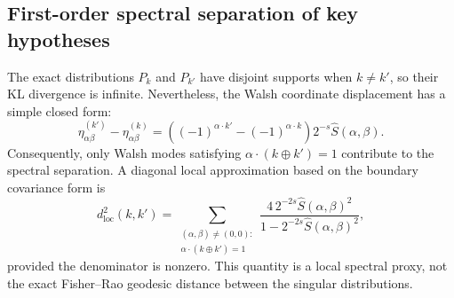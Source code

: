 \subsection{First-order spectral separation of key hypotheses}

The exact distributions $P_k$ and $P_{k'}$ have disjoint supports when
$k\neq k'$, so their KL divergence is infinite.  Nevertheless, the Walsh
coordinate displacement has a simple closed form:
\begin{equation}\label{eq:eta-displacement}
  \eta^{(k')}_{\alpha\beta}-\eta^{(k)}_{\alpha\beta}
  =\left((-1)^{\alpha\cdot k'}-(-1)^{\alpha\cdot k}\right)2^{-s}\widehat S(\alpha,\beta).
\end{equation}
Consequently, only Walsh modes satisfying $\alpha\cdot(k\oplus k')=1$ contribute
to the spectral separation.  A diagonal local approximation based on the
boundary covariance form is
\begin{equation}\label{eq:fr-local}
  d_{\mathrm{loc}}^2(k,k')
  =\sum_{\substack{(\alpha,\beta)\neq(0,0):\\
  \alpha\cdot(k\oplus k')=1}}
  \frac{4\,2^{-2s}\widehat S(\alpha,\beta)^2}
  {1-2^{-2s}\widehat S(\alpha,\beta)^2},
\end{equation}
provided the denominator is nonzero.  This quantity is a local spectral proxy,
not the exact Fisher--Rao geodesic distance between the singular distributions.
